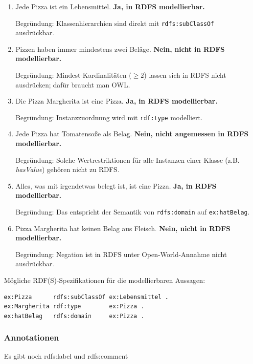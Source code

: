 \documentclass[a4paper]{article}
\begin{document}
\begin{enumerate}
    \item Jede Pizza ist ein Lebensmittel. \textbf{Ja, in RDFS modellierbar.}

    Begründung: Klassenhierarchien sind direkt mit \texttt{rdfs:subClassOf} ausdrückbar.

    \item Pizzen haben immer mindestens zwei Beläge. \textbf{Nein, nicht in RDFS modellierbar.}

    Begründung: Mindest-Kardinalitäten (\(\ge 2\)) lassen sich in RDFS nicht ausdrücken; dafür braucht man OWL.

    \item Die Pizza Margherita ist eine Pizza. \textbf{Ja, in RDFS modellierbar.}

    Begründung: Instanzzuordnung wird mit \texttt{rdf:type} modelliert.

    \item Jede Pizza hat Tomatensoße als Belag. \textbf{Nein, nicht angemessen in RDFS modellierbar.}

    Begründung: Solche Wertrestriktionen für alle Instanzen einer Klasse (z.B. \textit{hasValue}) gehören nicht zu RDFS.

    \item Alles, was mit irgendetwas belegt ist, ist eine Pizza. \textbf{Ja, in RDFS modellierbar.}

    Begründung: Das entspricht der Semantik von \texttt{rdfs:domain} auf \texttt{ex:hatBelag}.

    \item Pizza Margherita hat keinen Belag aus Fleisch. \textbf{Nein, nicht in RDFS modellierbar.}

    Begründung: Negation ist in RDFS unter Open-World-Annahme nicht ausdrückbar.
\end{enumerate}

Mögliche RDF(S)-Spezifikationen für die modellierbaren Aussagen:

\begin{lstlisting}
ex:Pizza      rdfs:subClassOf ex:Lebensmittel .
ex:Margherita rdf:type        ex:Pizza .
ex:hatBelag   rdfs:domain     ex:Pizza .
\end{lstlisting}

\subsubsection{Annotationen}

Es gibt noch rdfs:label und rdfs:comment
\end{document}
